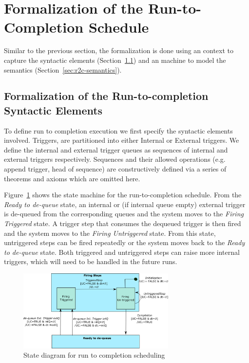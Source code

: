 \section{Formalization of the Run-to-Completion Schedule}
\label{sec:r2c}
Similar to the previous section, the formalization is done using an \EventB context to capture the syntactic elements (Section~\ref{sec:r2c-syntax}) and an \EventB machine to model the semantics (Section~\ref{sec:r2c-semantics}).

\subsection{Formalization of the Run-to-completion Syntactic Elements}
\label{sec:r2c-syntax}
To define run to completion execution we first specify the  syntactic elements involved. 
Triggers, are partitioned into either  Internal or External triggers.
We define the internal and external trigger queues as sequences of internal and external triggers respectively. Sequences and their allowed operations (e.g. append trigger, head of sequence) are constructively defined via a series of theorems and axioms which are omitted here.

Figure~\ref{fig:run-to-completion} shows the state machine for the run-to-completion schedule. 
From the \emph{Ready to de-queue} state, an internal or (if internal queue empty) external trigger is de-queued from the corresponding queues and the system moves to the \emph{Firing Triggered} state.
A trigger step that consumes the dequeued trigger is then fired and the system moves to the \emph{Firing Untriggered} state. 
From this state, untriggered steps can be fired repeatedly or the system moves back to the \emph{Ready to de-queue} state. 
Both triggered and untriggered steps can raise more internal triggers, which will need to be handled in the future runs.
\begin{figure}[!t]
\centering
\includegraphics[width=0.7\textwidth]{figures/run-to-completion.png}
\caption{State diagram for run to completion scheduling}
\label{fig:run-to-completion}
\end{figure}

